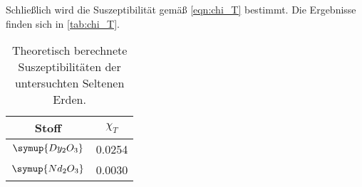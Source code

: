 Schließlich wird die Suszeptibilität gemäß \autoref{eqn:chi_T} bestimmt.
Die Ergebnisse finden sich in \autoref{tab:chi_T}.

\begin{table}[H]
  \centering
  \caption{Theoretisch berechnete Suszeptibilitäten der untersuchten Seltenen Erden.}
  \label{tab:chi_T}
  \begin{tabular}{c S}
  \toprule
  Stoff &
  $\chi_T$ \\
  \midrule
  $\symup{Dy_2O_3}$ & 0.0254 \\
  $\symup{Nd_2O_3}$ & 0.0030 \\
  \bottomrule
  \end{tabular}
\end{table}
